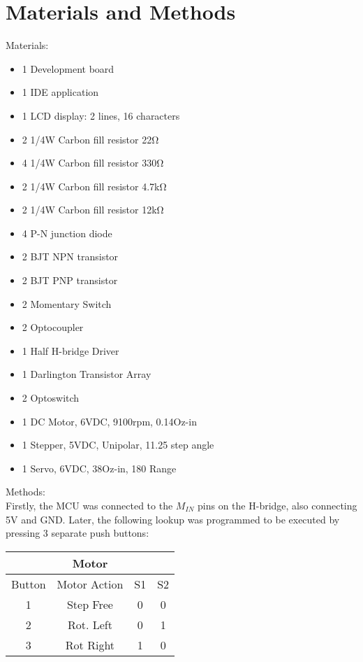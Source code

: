 \documentclass[journal]{IEEEtran}
\begin{document}
\section{Materials and Methods}
Materials:
\begin{itemize}
  \item 1 Development board
  \item 1 IDE application
  \item 1 LCD display: 2 lines, 16 characters
  \item 2 1/4W Carbon fill resistor 22\si{\ohm}
  \item 4 1/4W Carbon fill resistor 330\si{\ohm}
  \item 2 1/4W Carbon fill resistor 4.7\si{\kilo\ohm}
  \item 2 1/4W Carbon fill resistor 12\si{\kilo\ohm}
  \item 4 P-N junction diode
  \item 2 BJT NPN transistor
  \item 2 BJT PNP transistor
  \item 2 Momentary Switch
  \item 2 Optocoupler
  \item 1 Half H-bridge Driver
  \item 1 Darlington Transistor Array
  \item 2 Optoswitch
  \item 1 DC Motor, 6VDC, 9100rpm, 0.14Oz-in
  \item 1 Stepper, 5VDC, Unipolar, 11.25 step angle
  \item 1 Servo, 6VDC, 38Oz-in, 180 Range
\end{itemize}
Methods:\\
Firstly, the MCU was connected to the $M_{IN}$ pins on the H-bridge, also connecting 5\si{\V} and GND. Later, the following lookup was programmed to be executed by pressing 3 separate push buttons:
\begin{table}[H]
  \begin{center}
\begin{tabular}{|c|c|c|c|}
  \hline
  \multicolumn{4}{|c|}{Motor}\\
  \hline
  Button&Motor Action&S1&S2\\
  \hline
  1&Step Free&0&0\\
  2&Rot. Left&0&1\\
  3&Rot Right&1&0\\
  \hline
\end{tabular}
  \end{center}
\end{table}
\end{document}
